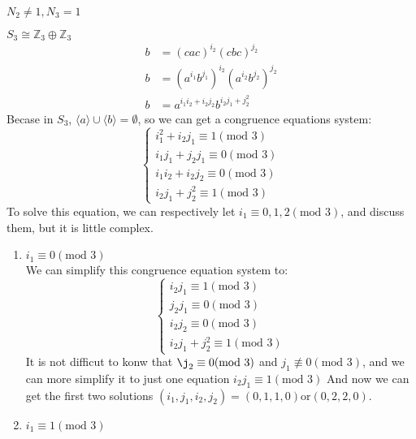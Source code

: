 \documentclass[a4paper,14pt]{article}
\begin{document}
\begin{enumerate}
\begin{item}{$N_2 \neq 1, N_3 = 1$}
\begin{enumerate}
\begin{item}{$S_3\cong \mathbb{Z}_3 \oplus \mathbb{Z}_3$}
\begin{align*}
                        b &= (cac)^{i_2}(cbc)^{j_2}\\
                        b &= (a^{i_1}b^{j_1})^{i_2}(a^{i_2}b^{j_2})^{j_2}\\
                        b &= a^{i_1i_2+i_2j_2}b^{i_2j_1+j_2^2}
                    \end{align*}
                    Becase in $S_3$, $\langle a \rangle \cup \langle b \rangle = \emptyset$, so we can get a congruence equations system:
                    $$
                    \begin{cases}
                        i_1^2 + i_2j_1 \equiv 1 (\text{mod 3})\\
                        i_1j_1+ j_2j_1 \equiv 0 (\text{mod 3})\\
                        i_1i_2+ i_2j_2 \equiv 0 (\text{mod 3})\\
                        i_2j_1+ j_2^2  \equiv 1 (\text{mod 3})
                    \end{cases}
                    $$
                    To solve this equation, we can respectively let $i_1 \equiv 0,1,2 (\text{mod 3})$, and discuss them, but it is little complex.
                    \begin{enumerate}
                        \item $i_1 \equiv 0 (\text{mod 3})$\\
                            We can simplify this congruence equation system to:
                            $$
                            \begin{cases}
                            i_2j_1 \equiv 1 (\text{mod 3})\\
                            j_2j_1 \equiv 0 (\text{mod 3})\\
                            i_2j_2 \equiv 0 (\text{mod 3})\\
                            i_2j_1+ j_2^2  \equiv 1 (\text{mod 3})
                            \end{cases}
                            $$
                            It is not difficut to konw that $\j_2 \equiv 0 (\text{mod 3})$ and $j_1 \not \equiv 0 (\text{mod 3})$, and we can
                            more simplify it to just one equation $i_2j_1 \equiv 1 (\text{mod 3})$
                            And now we can get the first two solutions $(i_1,j_1,i_2,j_2) = (0,1,1,0) \text{or} (0,2,2,0)$.
                        \item $i_1 \equiv 1 (\text{mod 3})$\\

\end{enumerate}
\end{item}
\end{enumerate}
\end{item}
\end{enumerate}
\end{document}
